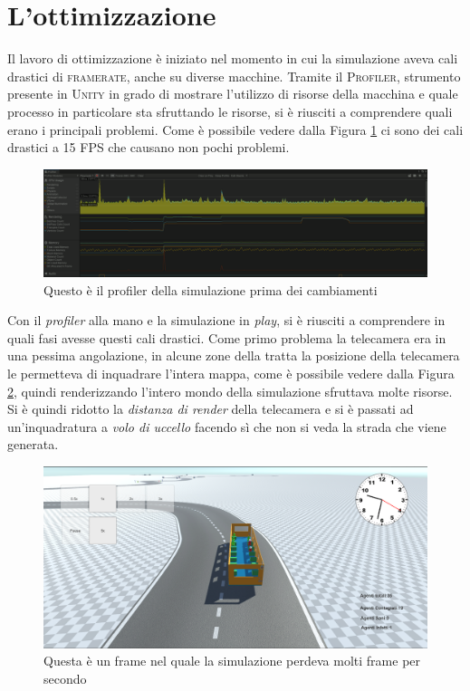 \documentclass[12pt, openany]{book}
\begin{document}
 	\section{L'ottimizzazione}
Il lavoro di ottimizzazione è iniziato nel momento in cui la simulazione aveva cali drastici di \textsc{framerate}, anche su diverse macchine. Tramite il  \textsc{Profiler}, strumento presente in \textsc{Unity} in grado di mostrare l'utilizzo di risorse della macchina e quale processo in particolare sta sfruttando le risorse, si è riusciti a comprendere quali erano i principali problemi. Come è possibile vedere dalla Figura \ref{fig:ProfilerFPSBassi} ci sono dei cali drastici a 15 \textsc{FPS} che causano non pochi problemi.
\begin{figure}[H]
	\centering
	\includegraphics[width=1\linewidth]{"Immagini/ProfilerFPSBassi.png"}
	\caption{Questo è il profiler della simulazione prima dei cambiamenti}
	\label{fig:ProfilerFPSBassi}
\end{figure}
Con il \emph{profiler} alla mano e la simulazione in \emph{play}, si è riusciti a comprendere in quali fasi avesse questi cali drastici. Come primo problema la telecamera era in una pessima angolazione, in alcune zone della tratta la posizione della telecamera le permetteva di inquadrare l'intera mappa, come è possibile vedere dalla Figura \ref{fig:CameraBrutta}, quindi renderizzando l'intero mondo della simulazione sfruttava molte risorse. Si è quindi ridotto la \emph{distanza di render} della telecamera e si è passati ad un'inquadratura a \emph{volo di uccello} facendo sì che non si veda la strada che viene generata.
\begin{figure}[H]
	\centering
	\includegraphics[width=1\linewidth]{"Immagini/CameraBrutta.png"}
	\caption{Questa è un frame nel quale la simulazione perdeva molti frame per secondo}
	\label{fig:CameraBrutta}
\end{figure}
\end{document}
